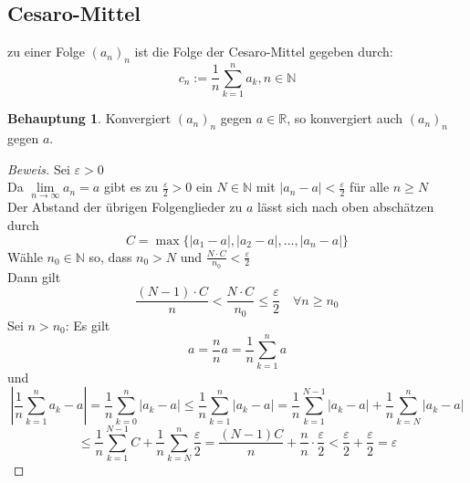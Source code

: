 \documentclass[12pt,a4paper,titlepage]{article} %
\theoremstyle{definition}
\newtheorem*{beh}{Behauptung}
\theoremstyle{remark}
\newenvironment{bew}{\begin{proof}[Beweis]}{\end{proof}}
\newcommand{\N}{\mathbb{N}}
\newcommand{\R}{\mathbb{R}}
\newcommand{\limes}[1]{\lim\limits_{#1\rightarrow\infty}}
\begin{document}
	\subsection{Cesaro-Mittel}
	zu einer Folge \((a_n)_n\) ist die Folge der Cesaro-Mittel gegeben durch:
	\[c_n := \frac{1}{n} \sum_{k=1}^{n} a_k, n\in \N\]
	\begin{beh}
		Konvergiert \((a_n)_n\) gegen \(a \in \R\), so konvergiert auch \((a_n)_n\) gegen \(a\).
	\end{beh}
	\begin{bew}
		Sei \(\varepsilon > 0\)\\
		Da \(\limes{n} a_n = a\) gibt es zu \(\frac{\varepsilon}{2} > 0\) ein \(N \in \N\) mit \(|a_n -a| < \frac{\varepsilon}{2}\) für alle \(n \geq N\)\\
		Der Abstand der übrigen Folgenglieder zu \(a\) lässt sich nach oben abschätzen durch
		\[C = \max\{|a_1-a|,|a_2-a|, \dots, |a_n-a|\}\]
		Wähle \(n_0 \in \N\) so, dass \(n_0 > N\) und \(\frac{N \cdot C}{n_0} < \frac{\varepsilon}{2}\)\\
		Dann gilt
		\[\frac{(N-1) \cdot C}{n} < \frac{N \cdot C}{n_0} \leq \frac{\varepsilon}{2} \quad \forall n \geq n_0\]
		Sei \(n > n_0\): Es gilt
		\[a = \frac{n}{n}a = \frac{1}{n} \sum_{k=1}^{n} a\]
		und
		\[\left|\frac{1}{n} \sum_{k=1}^{n} a_k-a\right| = \frac{1}{n} \sum_{k=0}^{n} |a_k-a| \leq \frac{1}{n} \sum_{k=1}^{n} |a_k-a| = \frac{1}{n} \sum_{k=1}^{N-1} |a_k-a| + \frac{1}{n} \sum_{k=N}^{n} |a_k-a|\]
		\[\leq \frac{1}{n} \sum_{k=1}^{N-1} C + \frac{1}{n} \sum_{k=N}^{n} \frac{\varepsilon}{2} = \frac{(N-1)C}{n} + \frac{n}{n} \cdot \frac{\varepsilon}{2} < \frac{\varepsilon}{2} + \frac{\varepsilon}{2} = \varepsilon \]
	\end{bew}
\end{document}
